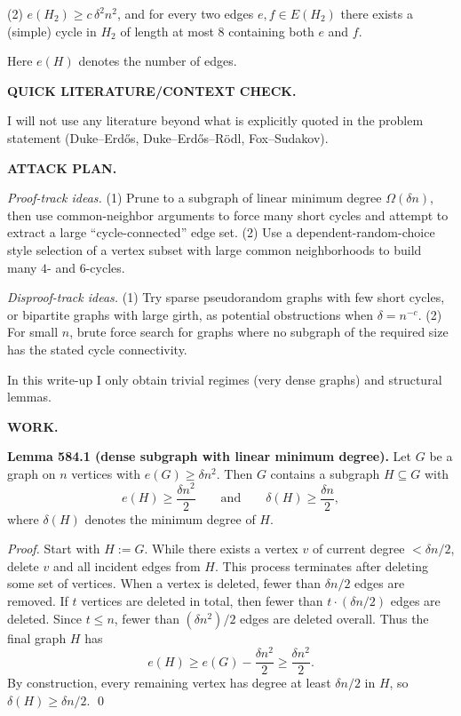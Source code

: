 (2) $e(H_2)\ge c\,\delta^2 n^2$, and for every two edges $e,f\in E(H_2)$ there exists a (simple) cycle in $H_2$ of length at most $8$ containing both $e$ and $f$.

Here $e(H)$ denotes the number of edges.

\bigskip
\noindent\textbf{QUICK LITERATURE/CONTEXT CHECK.}

I will not use any literature beyond what is explicitly quoted in the problem statement (Duke--Erd\H{o}s, Duke--Erd\H{o}s--R\"{o}dl, Fox--Sudakov).

\bigskip
\noindent\textbf{ATTACK PLAN.}

\emph{Proof-track ideas.}
(1) Prune to a subgraph of linear minimum degree $\Omega(\delta n)$, then use common-neighbor arguments to force many short cycles and attempt to extract a large ``cycle-connected'' edge set.
(2) Use a dependent-random-choice style selection of a vertex subset with large common neighborhoods to build many $4$- and $6$-cycles.

\emph{Disproof-track ideas.}
(1) Try sparse pseudorandom graphs with few short cycles, or bipartite graphs with large girth, as potential obstructions when $\delta=n^{-c}$.
(2) For small $n$, brute force search for graphs where no subgraph of the required size has the stated cycle connectivity.

In this write-up I only obtain trivial regimes (very dense graphs) and structural lemmas.

\bigskip
\noindent\textbf{WORK.}

\noindent\textbf{Lemma 584.1 (dense subgraph with linear minimum degree).}
Let $G$ be a graph on $n$ vertices with $e(G)\ge \delta n^2$.
Then $G$ contains a subgraph $H\subseteq G$ with
\[
 e(H)\ge \frac{\delta n^2}{2}
 \qquad\text{and}\qquad
 \delta(H)\ge \frac{\delta n}{2},
\]
where $\delta(H)$ denotes the minimum degree of $H$.

\noindent\emph{Proof.}
Start with $H:=G$.
While there exists a vertex $v$ of current degree $<\delta n/2$, delete $v$ and all incident edges from $H$.
This process terminates after deleting some set of vertices.
When a vertex is deleted, fewer than $\delta n/2$ edges are removed.
If $t$ vertices are deleted in total, then fewer than $t\cdot(\delta n/2)$ edges are deleted.
Since $t\le n$, fewer than $(\delta n^2)/2$ edges are deleted overall.
Thus the final graph $H$ has
\[
 e(H)\ge e(G)-\frac{\delta n^2}{2}\ge \frac{\delta n^2}{2}.
\]
By construction, every remaining vertex has degree at least $\delta n/2$ in $H$, so $\delta(H)\ge \delta n/2$.
\qed

